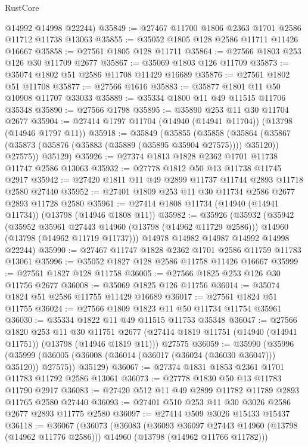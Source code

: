 \begin{lexlean}{RustCore}
\begin{coremodule}
      @14992
      @14998
      @22244)
@35849 := @27467 @11700 @1806 @2363 @1701 @2586 @11712 @11738 @13063
@35855 := @35052 @1805 @128 @2586 @11711 @11426 @16667
@35858 := @27561 @1805 @128 @11711
@35864 := @27566 @1803 @253 @126 @30 @11709 @2677
@35867 := @35069 @1803 @126 @11709
@35873 := @35074 @1802 @51 @2586 @11708 @11429 @16689
@35876 := @27561 @1802 @51 @11708
@35877 := @27566 @1616
@35883 := @35877 @1801 @11 @50 @10908 @11707 @33033
@35889 := @35334 @1800 @11 @49 @11515 @11706 @35348
@35890 := @27566 @1798
@35895 := @35890 @253 @11 @30 @11704 @2677
@35904 := @27414 @1797 @11704 (@14940 (@14941 @11704)) (@13798 (@14946 @1797 @11))
@35918 := @35849
    (@35855
      (@35858
        (@35864 (@35867 (@35873 (@35876 (@35883 (@35889 (@35895 @35904 @27575)))) @35120)) @27575))
      @35129)
@35926 := @27374 @1813 @1828 @2362 @1701 @11738 @11747 @2586 @13063
@35932 := @27778 @1812 @50 @13 @11738 @11745 @2917
@35942 := @27420 @1811 @11 @49 @2899 @11737 @11744 @2893 @11718 @2580 @27440
@35952 := @27401 @1809 @253 @11 @30 @11734 @2586 @2677 @2893 @11728 @2580
@35961 := @27414 @1808 @11734 (@14940 (@14941 @11734)) (@13798 (@14946 @1808 @11))
@35982 := @35926
    (@35932
      (@35942
        (@35952 @35961 @27443 @14960 (@13798 (@14962 @11729 @2586)))
        @14960
        (@13798 (@14962 @11719 @11737)))
      @14978
      @14982
      @14987
      @14992
      @14998
      @22244)
@35990 := @27467 @11747 @1828 @2362 @1701 @2586 @11759 @11783 @13061
@35996 := @35052 @1827 @128 @2586 @11758 @11426 @16667
@35999 := @27561 @1827 @128 @11758
@36005 := @27566 @1825 @253 @126 @30 @11756 @2677
@36008 := @35069 @1825 @126 @11756
@36014 := @35074 @1824 @51 @2586 @11755 @11429 @16689
@36017 := @27561 @1824 @51 @11755
@36024 := @27566 @1809 @1823 @11 @50 @11734 @11754 @35961
@36030 := @35334 @1822 @11 @49 @11515 @11753 @35348
@36047 := @27566
    @1820
    @253
    @11
    @30
    @11751
    @2677
    (@27414 @1819 @11751 (@14940 (@14941 @11751)) (@13798 (@14946 @1819 @11)))
    @27575
@36059 := @35990
    (@35996
      (@35999 (@36005 (@36008 (@36014 (@36017 (@36024 (@36030 @36047))) @35120)) @27575))
      @35129)
@36067 := @27374 @1831 @1853 @2361 @1701 @11783 @11792 @2586 @13061
@36073 := @27778 @1830 @50 @13 @11783 @11790 @2917
@36083 := @27420 @512 @11 @49 @2899 @11782 @11789 @2893 @11765 @2580 @27440
@36093 := @27401 @510 @253 @11 @30 @3026 @2586 @2677 @2893 @11775 @2580
@36097 := @27414 @509 @3026 @15433 @15437
@36118 := @36067
    (@36073
      (@36083
        (@36093 @36097 @27443 @14960 (@13798 (@14962 @11776 @2586)))
        @14960
        (@13798 (@14962 @11766 @11782)))

\end{coremodule}
\end{lexlean}
